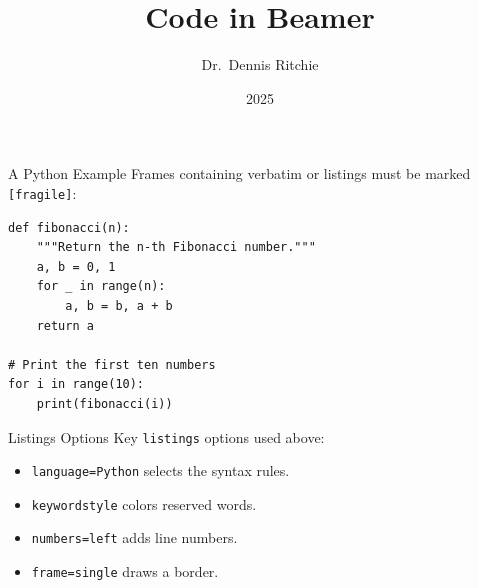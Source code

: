 \documentclass{beamer}
\title{Code in Beamer}
\author{Dr.~Dennis Ritchie}
\institute{Bell Labs}
\date{2025}
\begin{document}
\begin{frame}
  \titlepage
\end{frame}

\begin{frame}[fragile]{A Python Example}
  Frames containing verbatim or listings must be marked \texttt{[fragile]}:
\begin{lstlisting}[style=pystyle]
def fibonacci(n):
    """Return the n-th Fibonacci number."""
    a, b = 0, 1
    for _ in range(n):
        a, b = b, a + b
    return a

# Print the first ten numbers
for i in range(10):
    print(fibonacci(i))
\end{lstlisting}
\end{frame}

\begin{frame}[fragile]{Listings Options}
  Key \texttt{listings} options used above:
  \begin{itemize}
    \item \texttt{language=Python} selects the syntax rules.
    \item \texttt{keywordstyle} colors reserved words.
    \item \texttt{numbers=left} adds line numbers.
    \item \texttt{frame=single} draws a border.
  \end{itemize}
\end{frame}
\end{document}
